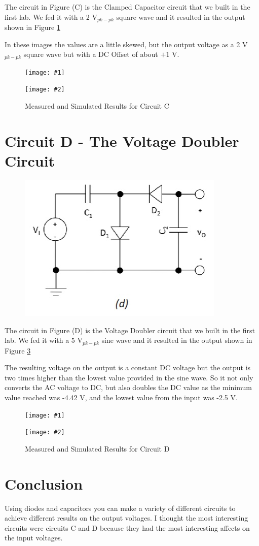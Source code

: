 \documentclass{article}
\newcommand{\twopics}[4]{
\begin{figure}
\begin{center}
  \begin{minipage}{.45\textwidth}
    \texttt{[image: \#1]}
  \end{minipage}
  \begin{minipage}{.45\textwidth}
    \texttt{[image: \#2]}
  \end{minipage}
  \label{#3}
  \caption{#4}
\end{center}
\end{figure}
}
\begin{document}
The circuit in Figure (C) is the Clamped Capacitor
circuit that we built in the first lab. 
We fed it with a 2 V$_{pk-pk}$ square wave and it 
resulted in the output shown in Figure \ref{circuitclinear}

In these images the values are a little skewed, but the
output voltage as a 2 V$_{pk-pk}$ square wave but with a 
DC Offset of about $+ 1$ V.

\twopics{imgs/scope/scope_CircuitC}{imgs/sim/Circuit C}{circuitclinear}{Measured and Simulated Results for Circuit C}

\pagebreak
\section{Circuit D - The Voltage Doubler Circuit}


\begin{figure}[h!]
  \centering
  \includegraphics{imgs/circuits/circuitd.jpg}
  \label{circuitd}
\end{figure}

The circuit in Figure (D) is the Voltage Doubler
circuit that we built in the first lab. 
We fed it with a 5 V$_{pk-pk}$ sine wave and it 
resulted in the output shown in Figure \ref{circuitdlinear}

The resulting voltage on the output is a constant DC 
voltage but the output is two times higher than the 
lowest value provided in the sine wave. So it not
only converts the AC voltage to DC, but also doubles the
DC value as the minimum value reached was -4.42 V, and 
the lowest value from the input was -2.5 V.

\twopics{imgs/scope/scope_CircuitD}{imgs/sim/Circuit D}{circuitdlinear}{Measured and Simulated Results for Circuit D}


\pagebreak
\section{Conclusion}
Using diodes and capacitors you can make a variety of 
different circuits to achieve different results on the
output voltages. I thought the most interesting circuits
were circuits C and D because they had the most 
interesting affects on the input voltages.
\end{document}
